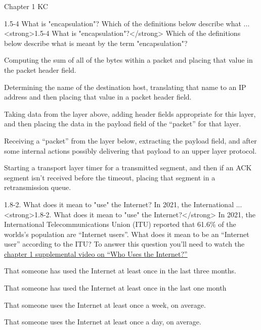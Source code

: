 \documentclass[a4paper]{article}
\begin{document}
\begin{quiz}{Chapter 1 KC}
\begin{multi}[points=1]{1.5-4 What is "encapsulation"? Which of the definitions below describe what ...}
<strong>1.5-4 What is "encapsulation"?</strong> Which of the definitions below describe what is meant by the term "encapsulation"?
\item Computing the sum of all of the bytes within a packet and placing that value in the packet header field.
\item Determining the name of the destination host, translating that name to an IP address and then placing that value in a packet header field.
\item* Taking data from the layer above, adding header fields appropriate for this layer, and then placing the data in the payload field of the “packet” for that layer.
\item Receiving a “packet” from the layer below, extracting the payload field, and after some internal actions possibly delivering that payload to an upper layer protocol.
\item Starting a transport layer timer for a transmitted segment, and then if an ACK segment isn’t received before the timeout, placing that segment in a retransmission queue.
\end{multi}

\begin{multi}[points=1]{1.8-2. What does it mean to "use" the Internet? In 2021, the International ...}
<strong>1.8-2. What does it mean to "use" the Internet?</strong> In 2021, the International Telecommunications Union (ITU) reported that 61.6\% of the worlds’s population are “Internet users”.  What does it mean to be an “Internet user” according to the ITU? To answer this question you’ll need to watch the \href{https://www.youtube.com/watch?v=-YaGGf8C1A4}{chapter 1 supplemental video on “Who Uses  the Internet?”}
\item* That someone has used the Internet at least once in the last three months.
\item That someone has used the Internet at least once in the last one month
\item That someone uses the Internet at least once a week, on average.
\item That someone uses the Internet at least once a day, on average.
\end{multi}


\end{quiz}
\end{document}

